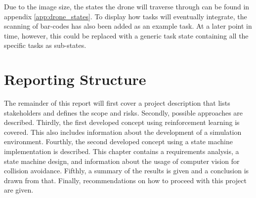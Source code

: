 Due to the image size, the states the drone will traverse through can be found in appendix \ref{app:drone_states}. To display how tasks will eventually integrate, the scanning of bar-codes has also been added as an example task. At a later point in time, however, this could be replaced with a generic task state containing all the specific tasks as sub-states.

\section{Reporting Structure}
\label{sec:structure}
The remainder of this report will first cover a project description that lists stakeholders and defines the scope and risks. Secondly, possible approaches are described. Thirdly, the first developed concept using reinforcement learning is covered. This also includes information about the development of a simulation environment. Fourthly, the second developed concept using a state machine implementation is described. This chapter contains a requirements analysis, a state machine design, and information about the usage of computer vision for collision avoidance. Fifthly, a summary of the results is given and a conclusion is drawn from that. Finally, recommendations on how to proceed with this project are given.
